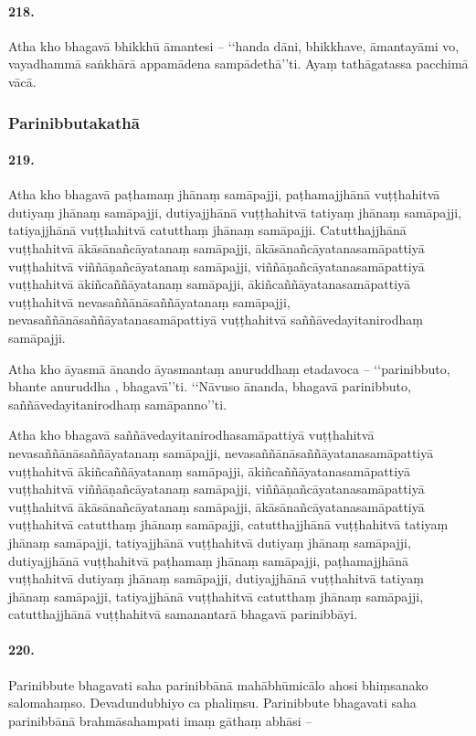\paragraph{218.} Atha kho bhagavā bhikkhū āmantesi – ‘‘handa dāni, bhikkhave, āmantayāmi vo, vayadhammā saṅkhārā appamādena sampādethā’’ti. Ayaṃ tathāgatassa pacchimā vācā.

\subsubsection{Parinibbutakathā}

\paragraph{219.} Atha kho bhagavā paṭhamaṃ jhānaṃ samāpajji, paṭhamajjhānā vuṭṭhahitvā dutiyaṃ jhānaṃ samāpajji, dutiyajjhānā vuṭṭhahitvā tatiyaṃ jhānaṃ samāpajji, tatiyajjhānā vuṭṭhahitvā catutthaṃ jhānaṃ samāpajji. Catutthajjhānā vuṭṭhahitvā ākāsānañcāyatanaṃ samāpajji, ākāsānañcāyatanasamāpattiyā vuṭṭhahitvā viññāṇañcāyatanaṃ samāpajji, viññāṇañcāyatanasamāpattiyā vuṭṭhahitvā ākiñcaññāyatanaṃ samāpajji, ākiñcaññāyatanasamāpattiyā vuṭṭhahitvā nevasaññānāsaññāyatanaṃ samāpajji, nevasaññānāsaññāyatanasamāpattiyā vuṭṭhahitvā saññāvedayitanirodhaṃ samāpajji.

Atha kho āyasmā ānando āyasmantaṃ anuruddhaṃ etadavoca – ‘‘parinibbuto, bhante anuruddha , bhagavā’’ti. ‘‘Nāvuso ānanda, bhagavā parinibbuto, saññāvedayitanirodhaṃ samāpanno’’ti.

Atha kho bhagavā saññāvedayitanirodhasamāpattiyā vuṭṭhahitvā nevasaññānāsaññāyatanaṃ samāpajji, nevasaññānāsaññāyatanasamāpattiyā vuṭṭhahitvā ākiñcaññāyatanaṃ samāpajji, ākiñcaññāyatanasamāpattiyā vuṭṭhahitvā viññāṇañcāyatanaṃ samāpajji, viññāṇañcāyatanasamāpattiyā vuṭṭhahitvā ākāsānañcāyatanaṃ samāpajji, ākāsānañcāyatanasamāpattiyā vuṭṭhahitvā catutthaṃ jhānaṃ samāpajji, catutthajjhānā vuṭṭhahitvā tatiyaṃ jhānaṃ samāpajji, tatiyajjhānā vuṭṭhahitvā dutiyaṃ jhānaṃ samāpajji, dutiyajjhānā vuṭṭhahitvā paṭhamaṃ jhānaṃ samāpajji, paṭhamajjhānā vuṭṭhahitvā dutiyaṃ jhānaṃ samāpajji, dutiyajjhānā vuṭṭhahitvā tatiyaṃ jhānaṃ samāpajji, tatiyajjhānā vuṭṭhahitvā catutthaṃ jhānaṃ samāpajji, catutthajjhānā vuṭṭhahitvā samanantarā bhagavā parinibbāyi.

\paragraph{220.} Parinibbute bhagavati saha parinibbānā mahābhūmicālo ahosi bhiṃsanako salomahaṃso. Devadundubhiyo ca phaliṃsu. Parinibbute bhagavati saha parinibbānā brahmāsahampati imaṃ gāthaṃ abhāsi –

